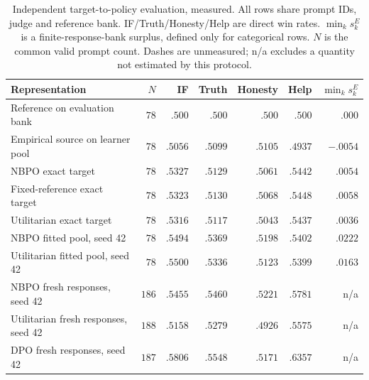 \documentclass{article}
\theoremstyle{remark}
\theoremstyle{plain}
\begin{document}
\begin{table}[t]
\centering\scriptsize
\setlength{\tabcolsep}{4pt}
\caption{Independent target-to-policy evaluation, measured. All rows share prompt IDs, judge and reference bank. IF/Truth/Honesty/Help are direct win rates. $\min_k s_k^{E}$ is a finite-response-bank surplus, defined only for categorical rows. $N$ is the common valid prompt count. Dashes are unmeasured; n/a excludes a quantity not estimated by this protocol.}
\label{tab:target-transfer}
\begin{tabular}{lrrrrrr}
\toprule
Representation & $N$ & IF & Truth & Honesty & Help & $\min_k s_k^{E}$\\
\midrule
Reference on evaluation bank & $78$ & $.500$ & $.500$ & $.500$ & $.500$ & $.000$\\
Empirical source on learner pool & $78$ & $.5056$ & $.5099$ & $.5105$ & $.4937$ & $-.0054$\\
\addlinespace
NBPO exact target & $78$ & $.5327$ & $.5129$ & $.5061$ & $.5442$ & $.0054$\\
Fixed-reference exact target & $78$ & $.5323$ & $.5130$ & $.5068$ & $.5448$ & $.0058$\\
Utilitarian exact target & $78$ & $.5316$ & $.5117$ & $.5043$ & $.5437$ & $.0036$\\
\addlinespace
NBPO fitted pool, seed 42 & $78$ & $.5494$ & $.5369$ & $.5198$ & $.5402$ & $.0222$\\
Utilitarian fitted pool, seed 42 & $78$ & $.5500$ & $.5336$ & $.5123$ & $.5399$ & $.0163$\\
\addlinespace
NBPO fresh responses, seed 42 & $186$ & $.5455$ & $.5460$ & $.5221$ & $.5781$ & n/a\\
Utilitarian fresh responses, seed 42 & $188$ & $.5158$ & $.5279$ & $.4926$ & $.5575$ & n/a\\
DPO fresh responses, seed 42 & $187$ & $.5806$ & $.5548$ & $.5171$ & $.6357$ & n/a\\
\bottomrule
\end{tabular}
\end{table}
\end{document}
